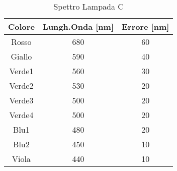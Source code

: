 \begin{table}[H]
\begin{center}
\caption{Spettro Lampada C}
\begin{tabular}{|c|c|c|}
\hline
Colore & Lungh.Onda [nm] & Errore [nm]\\ 
\hline
Rosso & 680 & 60 \\ 
Giallo & 590 & 40 \\ 
Verde1 & 560 & 30 \\ 
Verde2 & 530 & 20 \\ 
Verde3 & 500 & 20 \\ 
Verde4 & 500 & 20 \\ 
Blu1 & 480 & 20 \\ 
Blu2 & 450 & 10 \\ 
Viola & 440 & 10 \\ 
\hline
\end{tabular}
\end{center}
\label{label}
\end{table}
